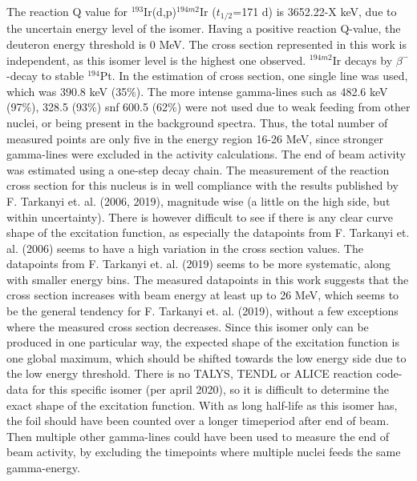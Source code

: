 \documentclass[a4paper,11pt,twoside]{book}
\begin{document}
\subsubsection{}
The reaction Q value for $^{193}$Ir(d,p)$^{194m2}$Ir ($t_{1/2}$=171 d) is 3652.22-X keV, due to the uncertain energy level of the isomer. Having a positive reaction Q-value, the deuteron energy threshold is 0 MeV. The cross section represented in this work is independent, as this isomer level is the highest one observed. $^{194m2}$Ir decays by $\beta^-$-decay to stable $^{194}$Pt. In the estimation of cross section, one single line was used, which was 390.8 keV (35\%). The more intense gamma-lines such as 482.6 keV (97\%), 328.5 (93\%) snf 600.5 (62\%)  were not used due to weak feeding from other nuclei, or being present in the background spectra. Thus, the total number of measured points are only five in the energy region 16-26 MeV, since stronger gamma-lines were excluded in the activity calculations. The end of beam activity was estimated using a one-step decay chain. The measurement of the reaction cross section for this nucleus is in well compliance with the results published by F. Tarkanyi et. al. (2006, 2019), magnitude wise (a little on the high side, but within uncertainty). There is however difficult to see if there is any clear curve shape of the excitation function, as especially the datapoints from F. Tarkanyi et. al. (2006) seems to have a high variation in the cross section values. The datapoints from F. Tarkanyi et. al. (2019) seems to be more systematic, along with smaller energy bins. The measured datapoints in this work suggests that the cross section increases with beam energy at least up to 26 MeV, which seems to be the general tendency for F. Tarkanyi et. al. (2019), without a few exceptions where the measured cross section decreases. Since this isomer only can be produced in one particular way, the expected shape of the excitation function is one global maximum, which should be shifted towards the low energy side due to the low energy threshold. There is no TALYS, TENDL or ALICE reaction code-data for this specific isomer (per april 2020), so it is difficult to determine the exact shape of the excitation function. With as long half-life as this isomer has, the foil should have been counted over a longer timeperiod after end of beam. Then multiple other gamma-lines could have been used to measure the end of beam activity, by excluding the timepoints where multiple nuclei feeds the same gamma-energy. 
\end{document}
